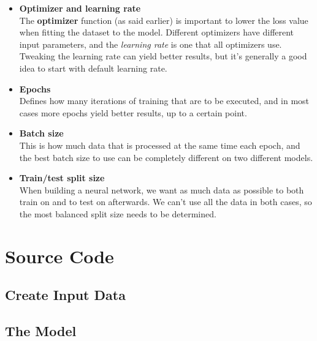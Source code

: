 \begin{itemize}
    \item \textbf{Optimizer and learning rate}\\
        The \textbf{optimizer} function (as said earlier) is important to lower the loss value when fitting the dataset to the model. 
        Different optimizers have different input parameters, and the \textit{learning rate} is one that all optimizers use. 
        Tweaking the learning rate can yield better results, 
        but it's generally a good idea to start with default learning rate. %
    \item \textbf{Epochs}\\
        Defines how many iterations of training that are to be executed, and in most cases more epochs yield better results, 
        up to a certain point.
    \item \textbf{Batch size}\\
        This is how much data that is processed at the same time each epoch, and the best batch size to use can be completely different on 
        two different models.  
    \item \textbf{Train/test split size}\\
        When building a neural network, we want as much data as possible to both train on and to test on afterwards. We can't use all the data 
        in both cases, so the most balanced split size needs to be determined.
\end{itemize}


\newpage

\section{Source Code}
\subsection{Create Input Data}


\newpage
\subsection{The Model}
